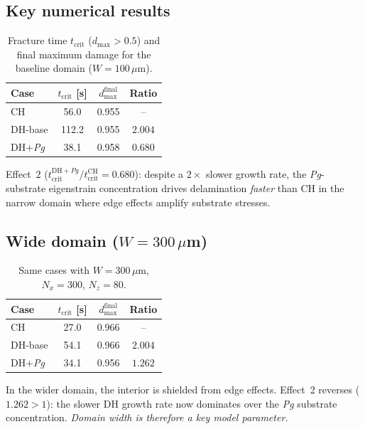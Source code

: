 \documentclass[11pt, a4paper]{article}
\newcommand{\um}{$\mu$m}        %
\begin{document}
\subsection{Key numerical results}

\begin{table}[h]
  \centering
  \caption{Fracture time $t_{\mathrm{crit}}$ ($d_{\max}>0.5$) and final maximum
           damage for the baseline domain ($W=100$\,\um).}
  \label{tab:results}
  \begin{tabular}{lccc}
    \toprule
    Case & $t_{\mathrm{crit}}$ [s] & $d_{\max}^{\mathrm{final}}$ & Ratio \\
    \midrule
    CH       & 56.0 & 0.955 & -- \\
    DH-base  & 112.2 & 0.955 & $2.004$ \\
    DH$+$\textit{Pg} & 38.1 & 0.958 & $0.680$ \\
    \bottomrule
  \end{tabular}
\end{table}

Effect~2 ($t_{\mathrm{crit}}^{\mathrm{DH}+Pg}/t_{\mathrm{crit}}^{\mathrm{CH}} = 0.680$):
despite a $2\times$ slower growth rate, the \textit{Pg}-substrate eigenstrain
concentration drives delamination \emph{faster} than CH in the narrow domain
where edge effects amplify substrate stresses.

\subsection{Wide domain ($W = 300$\,\um)}
\label{sec:wide}

\begin{table}[h]
  \centering
  \caption{Same cases with $W=300$\,\um, $N_x=300$, $N_z=80$.}
  \label{tab:wide}
  \begin{tabular}{lccc}
    \toprule
    Case & $t_{\mathrm{crit}}$ [s] & $d_{\max}^{\mathrm{final}}$ & Ratio \\
    \midrule
    CH       & 27.0 & 0.966 & -- \\
    DH-base  & 54.1 & 0.966 & $2.004$ \\
    DH$+$\textit{Pg} & 34.1 & 0.956 & $1.262$ \\
    \bottomrule
  \end{tabular}
\end{table}

In the wider domain, the interior is shielded from edge effects.
Effect~2 reverses ($1.262 > 1$): the slower DH growth rate now
dominates over the \textit{Pg} substrate concentration.
\emph{Domain width is therefore a key model parameter.}
\end{document}
